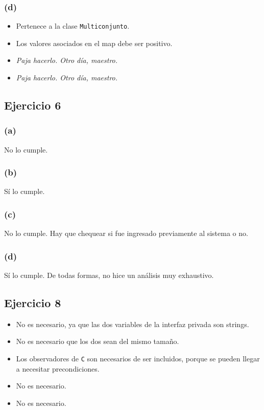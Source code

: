 \documentclass[12 pt]{article}
\begin{document}
    \subsubsection*{(d)}
        \begin{itemize}
            \item Pertenece a la clase \texttt{Multiconjunto}.
            \item Los valores asociados en el map debe ser positivo.
            \item \textit{Paja hacerlo. Otro día, maestro.}
            \item \textit{Paja hacerlo. Otro día, maestro.}
        \end{itemize}

\subsection*{Ejercicio 6}
    \subsubsection*{(a)}
        No lo cumple.
    \subsubsection*{(b)}
        Sí lo cumple.
    \subsubsection*{(c)}
        No lo cumple. Hay que chequear si fue ingresado previamente al sistema o no.
    \subsubsection*{(d)}
        Sí lo cumple. De todas formas, no hice un análisis muy exhaustivo.

\subsection*{Ejercicio 8}
    \begin{itemize}
        \item No es necesario, ya que las dos variables de la interfaz privada son strings.
        \item No es necesario que los dos sean del mismo tamaño.
        \item Los observadores de \texttt{C} son necesarios de ser incluidos, porque se pueden llegar a necesitar precondiciones.
        \item No es necesario.
        \item No es necesario.
    \end{itemize}
\end{document}
